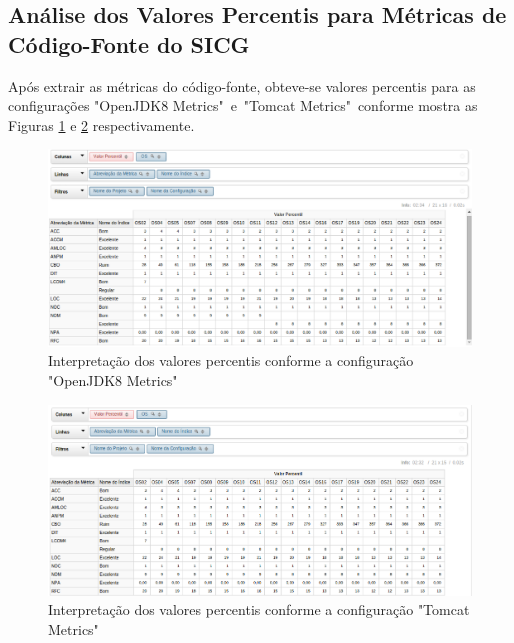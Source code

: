 \subsection{Análise dos Valores Percentis para Métricas de Código-Fonte do SICG}

\textcolor{red}{}

Após extrair as métricas do código-fonte, obteve-se valores percentis para as configurações "OpenJDK8 Metrics"~e~"Tomcat Metrics"~conforme mostra as Figuras \ref{fig:total-openJDK8} e \ref{fig:total-tomcat}   
respectivamente.

\begin{figure}
\centering
\includegraphics[keepaspectratio=true,scale=0.7]{figuras/total-OpenJDK.eps}
\caption{Interpretação dos valores percentis conforme a configuração "OpenJDK8 Metrics"}
\label{fig:total-openJDK8}
\end{figure}
\FloatBarrier

\begin{figure}
\centering
\includegraphics[keepaspectratio=true,scale=0.7]{figuras/total-tomcat.eps}
\caption{Interpretação dos valores percentis conforme a configuração "Tomcat Metrics"}
\label{fig:total-tomcat}
\end{figure}
\FloatBarrier

